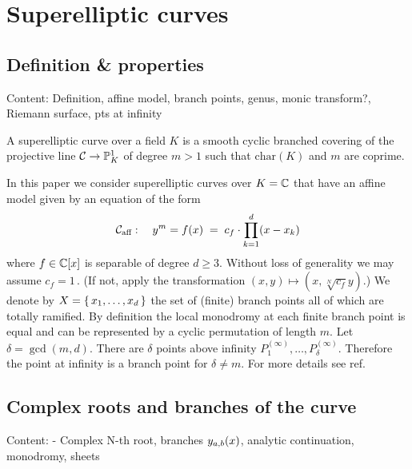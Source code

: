 \documentclass[main.tex]{subfiles}
\begin{document}
  \section{Superelliptic curves}

  \subsection{Definition \& properties}
    Content: Definition, affine model, branch points, genus, monic transform?, Riemann surface, pts at infinity
    
    \begin{defn}\label{def:SEDEF}
       A superelliptic curve over a field $K$ is a smooth cyclic branched covering of the projective line 
       $\mathcal{C} \rightarrow \mathbb{P}^1_K$ of degree $m > 1$ such that $\text{char}(K)$ and $m$ are coprime.
   \end{defn}
   In this paper we consider superelliptic curves over $K = \mathbb{C}$ that have an affine model given by an equation of the form
    \begin{align}\label{eq:aff_model}
     \mathcal{C}_{\text{aff}} : \quad y^m = f(x) \;= \; c_f \cdot \prod_{k=1}^d (x-x_k)
    \end{align}
    where $f \in \mathbb{C}[x]$ is separable of degree $d \ge 3$.
    Without loss of generality we may assume $c_f = 1$\,. (If not, apply the transformation $(x,y) \mapsto (x,\sqrt[N]{c_f}y)$.)
    We denote by $X = \{ \, x_1,\dots,x_d \,\}$ the set of (finite) branch points all of which are totally ramified. By definition
  the local monodromy at each finite branch point is equal and can be represented by a cyclic permutation of length $m$.
  Let $\delta = \gcd(m,d)$. There are $\delta$ points above infinity $P_1^{(\infty)},\dots,P_{\delta}^{(\infty)}$. Therefore
  the point at infinity is a branch point for $\delta \ne m$. For more details see \todo ref.
  
  \subsection{Complex roots and branches of the curve}
    Content: - Complex N-th root, branches $y_{a,b}(x)$, analytic continuation, monodromy, sheets
  
\end{document}
